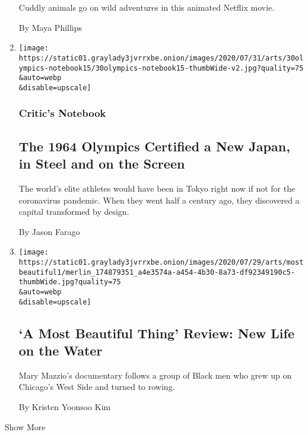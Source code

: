 \begin{enumerate}
  Cuddly animals go on wild adventures in this animated Netflix movie.

  By Maya Phillips
\item
  \href{/2020/07/30/arts/design/tokyo-olympics-1964-design.html}{}

  \texttt{[image: https://static01.graylady3jvrrxbe.onion/images/2020/07/31/arts/30olympics-notebook15/30olympics-notebook15-thumbWide-v2.jpg?quality=75\\\&auto=webp\\\&disable=upscale]}

  \hypertarget{critics-notebook-1}{%
  \subsubsection{Critic's Notebook}\label{critics-notebook-1}}

  \hypertarget{the-1964-olympics-certified-a-new-japan-in-steel-and-on-the-screen}{%
  \subsection{The 1964 Olympics Certified a New Japan, in Steel and on
  the
  Screen}\label{the-1964-olympics-certified-a-new-japan-in-steel-and-on-the-screen}}

  The world's elite athletes would have been in Tokyo right now if not
  for the coronavirus pandemic. When they went half a century ago, they
  discovered a capital transformed by design.

  By Jason Farago
\item
  \href{/2020/07/30/movies/a-most-beautiful-thing-review.html}{}

  \texttt{[image: https://static01.graylady3jvrrxbe.onion/images/2020/07/29/arts/mostbeautiful1/merlin\_174879351\_a4e3574a-a454-4b30-8a73-df92349190c5-thumbWide.jpg?quality=75\\\&auto=webp\\\&disable=upscale]}

  \hypertarget{a-most-beautiful-thing-review-new-life-on-the-water}{%
  \subsection{`A Most Beautiful Thing' Review: New Life on the
  Water}\label{a-most-beautiful-thing-review-new-life-on-the-water}}

  Mary Mazzio's documentary follows a group of Black men who grew up on
  Chicago's West Side and turned to rowing.

  By Kristen Yoonsoo Kim
\end{enumerate}

Show More

